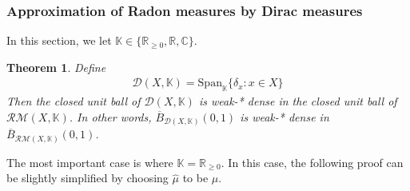 \documentclass[12pt,b5paper,notitlepage]{article}
\theoremstyle{definition}
\theoremstyle{plain}
\newtheorem{thm}[df]{Theorem}
\newcommand{\wht}{\widehat}
\newcommand{\ovl}{\overline}
\newcommand{\Span}{\mathrm{Span}}
\newcommand{\Kbb}{\mathbb K}
\newcommand{\Cbb}{\mathbb C}
\newcommand{\Rbb}{\mathbb R}
\newcommand{\MD}{\mathcal D}
\newcommand{\RM}{\mathcal {RM}}
\numberwithin{equation}{section}
\begin{document}
\subsubsection{Approximation of Radon measures by Dirac measures}

In this section, we let $\Kbb\in\{\Rbb_{\geq0},\Rbb,\Cbb\}$. 

\begin{thm}\label{lb105}
Define
\begin{align*}
\MD(X,\Kbb)=\Span_\Kbb\{\delta_x:x\in X\}
\end{align*}
Then the closed unit ball of $\MD(X,\Kbb)$ is weak-* dense in the closed unit ball of $\RM(X,\Kbb)$. In other words, $\ovl B_{\MD(X,\Kbb)}(0,1)$ is weak-* dense in $\ovl B_{\RM(X,\Kbb)}(0,1)$.
\end{thm}


The most important case is where $\Kbb=\Rbb_{\geq0}$. In this case, the following proof can be slightly simplified by choosing $\wht\mu$ to be $\mu$.
\end{document}
